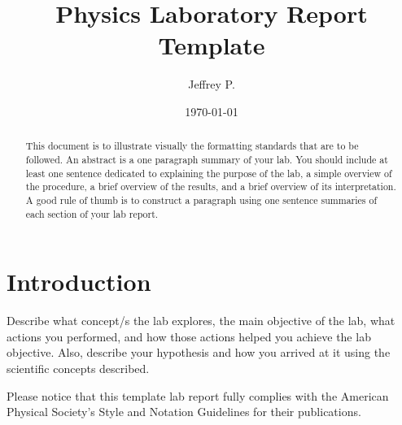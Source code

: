 \documentclass[
    10pt,aps,prl,
    amsfonts,
    amssymb,
    amsmath,
    draft,
    runinaddress,
    secnum,
    showkeys,
    superscriptaddress,
    twocolumn,
]{revtex4}
\begin{document}

\title{Physics Laboratory Report Template}

\author{Jeffrey P. }


\date{\today}

%

\begin{abstract}
    This document is to illustrate visually the formatting standards that
        are to be followed.
    An abstract is a one paragraph summary of your lab.
    You should include at least one sentence dedicated to explaining
        the purpose of the lab, a simple overview of the procedure,
        a brief overview of the results, and a brief overview of
        its interpretation.
    A good rule of thumb is to construct a paragraph using one 
        sentence summaries of each section of your lab report.
\end{abstract}

\maketitle


\section{Introduction}
    \label{sec:intro}
    Describe what concept/s the lab explores, 
        the main objective of the lab, 
        what actions you performed, 
        and how those actions helped you achieve the lab objective.
    Also, describe your hypothesis and how you arrived 
        at it using the scientific concepts described.

    Please notice that this template lab report fully complies
        with the American Physical Society's Style and Notation
        Guidelines for their publications.
\end{document}

